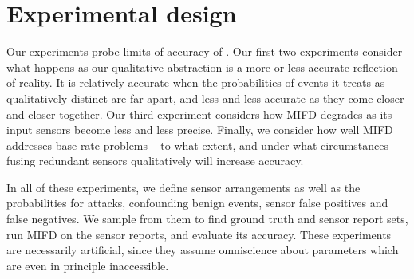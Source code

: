\section{Experimental design}
\label{sec:experimental-design}

Our experiments probe limits of accuracy of \zplus.
Our first two experiments consider what happens as our qualitative abstraction
is a more or less accurate reflection of reality.  It is relatively accurate when the
probabilities of events it treats as qualitatively distinct are far apart, and
less and less accurate as they come closer and closer together. 
Our third experiment considers how MIFD degrades as its input sensors become
less and less precise.
Finally, we consider how well MIFD addresses base rate problems -- to what
extent, and under what circumstances fusing redundant sensors qualitatively will
increase accuracy.

In all of these experiments, we define sensor arrangements as well as the probabilities for attacks, confounding
benign events, sensor false positives and false negatives. We sample from
them to find ground truth and sensor report sets, run MIFD on the sensor
reports, and evaluate its accuracy.
These experiments are necessarily artificial, since they assume
omniscience about parameters which are even in principle inaccessible.


